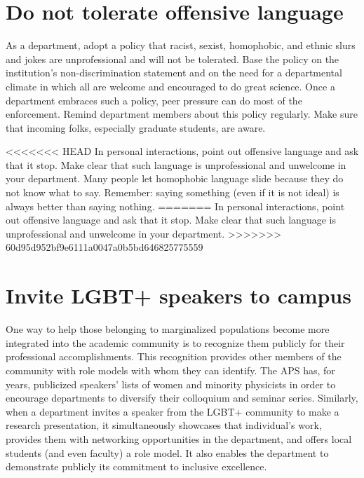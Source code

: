 \section {Do not tolerate offensive language}
\label{offensive-language}
As a department, adopt a policy that racist, sexist, homophobic, and ethnic slurs and jokes are unprofessional and will not be tolerated.  Base the policy on the institution's non-discrimination statement and on the need for a departmental climate in which all are welcome and encouraged to do great science.  Once a department embraces such a policy, peer pressure can do most of the enforcement.  Remind department members about this policy regularly.  Make sure that incoming folks, especially graduate students, are aware.

<<<<<<< HEAD
In personal interactions, point out offensive language and ask that it stop.  Make clear that such language is unprofessional and unwelcome in your department.  Many people let homophobic language slide because they do not know what to say.  Remember: saying something (even if it is not ideal) is always better than saying nothing.
=======
In personal interactions, point out offensive language and ask that it stop.  Make clear that such language is unprofessional and unwelcome in your department.
>>>>>>> 60d95d952bf9e6111a0047a0b5bd646825775559


\section {Invite LGBT+ speakers to campus}
\label{lgbt-speakers}
One way to help those belonging to marginalized populations become more integrated into the academic community is to recognize them publicly for their professional accomplishments. This recognition provides other members of the community with role models with whom they can identify. The APS has, for years, publicized speakers' lists of women and minority physicists in order to encourage departments to diversify their colloquium and seminar series.  Similarly, when a department invites a speaker from the LGBT+ community to make a research presentation, it simultaneously showcases that individual's work, provides them with networking opportunities in the department, and offers local students (and even faculty) a role model. It also enables the department to demonstrate publicly its commitment to inclusive excellence.

